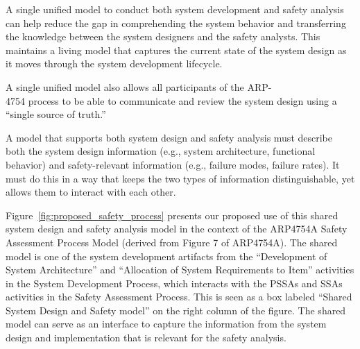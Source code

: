 A single unified model to conduct both system development and safety analysis can help reduce the gap in comprehending the system behavior and transferring the knowledge between the system designers and the safety analysts. This maintains a living model that captures the current state of the system design as it moves through the system development lifecycle.

A single unified model also allows all participants of the ARP- \\4754 process to be able to communicate and review the system design using a ``single source of truth.''

A model that supports both system design and safety analysis must describe both the system design information (e.g., system architecture, functional behavior) and safety-relevant information (e.g., failure modes, failure rates).  It must do this in a way that keeps the two types of information distinguishable, yet allows them to interact with each other.

Figure~\ref{fig:proposed_safety_process} presents our proposed use of this shared system design and safety analysis model in the context of the ARP4754A Safety Assessment Process Model (derived from Figure 7 of ARP4754A). The shared model is one of the system development artifacts from the ``Development of System Architecture'' and ``Allocation of System Requirements to Item'' activities in the System Development Process, which interacts with the PSSAs and SSAs activities in the Safety Assessment Process. This is seen as a box labeled ``Shared System Design and Safety model'' on the right column of the figure. The shared model can serve as an interface to capture the information from the system design and implementation that is relevant for the safety analysis.